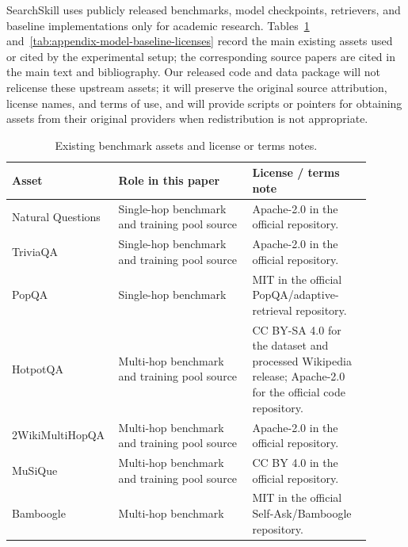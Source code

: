 \documentclass{article}
\begin{document}
SearchSkill uses publicly released benchmarks, model checkpoints, retrievers, and baseline implementations only for academic research. Tables~\ref{tab:appendix-benchmark-licenses} and~\ref{tab:appendix-model-baseline-licenses} record the main existing assets used or cited by the experimental setup; the corresponding source papers are cited in the main text and bibliography. Our released code and data package will not relicense these upstream assets; it will preserve the original source attribution, license names, and terms of use, and will provide scripts or pointers for obtaining assets from their original providers when redistribution is not appropriate.

\begin{table}[H]
  \centering
  \caption{Existing benchmark assets and license or terms notes.}
  \label{tab:appendix-benchmark-licenses}
  \setlength{\tabcolsep}{6pt}
  \renewcommand{\arraystretch}{1.12}
  \scriptsize
  \begin{tabular}{p{0.22\linewidth}p{0.36\linewidth}p{0.32\linewidth}}
    \toprule
    \textbf{Asset} & \textbf{Role in this paper} & \textbf{License / terms note} \\
    \midrule
    Natural Questions & Single-hop benchmark and training pool source & Apache-2.0 in the official repository. \\
    TriviaQA & Single-hop benchmark and training pool source & Apache-2.0 in the official repository. \\
    PopQA & Single-hop benchmark & MIT in the official PopQA/adaptive-retrieval repository. \\
    HotpotQA & Multi-hop benchmark and training pool source & CC BY-SA 4.0 for the dataset and processed Wikipedia release; Apache-2.0 for the official code repository. \\
    2WikiMultiHopQA & Multi-hop benchmark and training pool source & Apache-2.0 in the official repository. \\
    MuSiQue & Multi-hop benchmark and training pool source & CC BY 4.0 in the official repository. \\
    Bamboogle & Multi-hop benchmark & MIT in the official Self-Ask/Bamboogle repository. \\
    \bottomrule
  \end{tabular}
\end{table}
\end{document}

